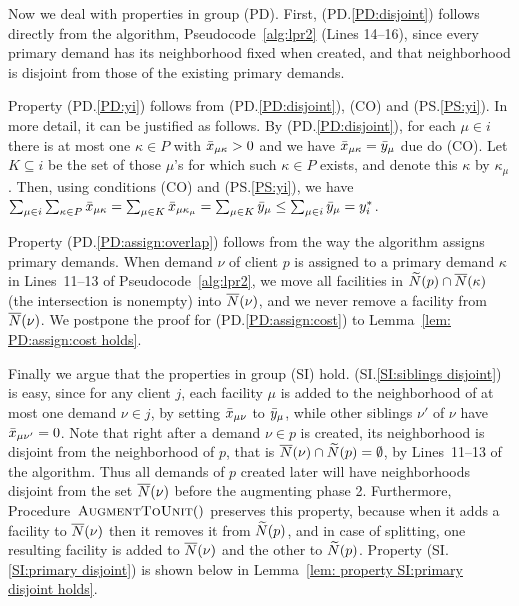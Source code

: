 \documentclass[oneside,final]{ucr}
\begin{document}
Now we deal with properties in group (PD).  First,
(PD.\ref{PD:disjoint}) follows directly from the algorithm,
Pseudocode~\ref{alg:lpr2} (Lines 14--16), since every
primary demand has its neighborhood fixed when created, and
that neighborhood is disjoint from those of the existing primary
demands.

Property (PD.\ref{PD:yi}) follows from (PD.\ref{PD:disjoint}), (CO) and
(PS.\ref{PS:yi}). In more detail, it can be justified as
follows. By (PD.\ref{PD:disjoint}), for each $\mu\in i$ there
is at most one $\kappa\in P$ with ${\bar x}_{\mu\kappa} > 0$
and we have ${\bar x}_{\mu\kappa} = {\bar y}_{\mu}$ due do (CO).
Let $K\subseteq i$ be the set of those $\mu$'s for which
such $\kappa\in P$ exists, and denote this $\kappa$ by
$\kappa_\mu$. Then, using conditions (CO) and
(PS.\ref{PS:yi}), we have $ \sum_{\mu\in i}\sum_{\kappa\in
  P}{\bar x}_{\mu\kappa} = \sum_{\mu\in K}{\bar x}_{\mu\kappa_\mu}
= \sum_{\mu\in K}{\bar y}_{\mu} \leq \sum_{\mu\in i}
{\bar y}_{\mu} = y_i^\ast$.

Property (PD.\ref{PD:assign:overlap}) follows from the way the algorithm
assigns primary demands.  When demand $\nu$ of
client $p$ is assigned to a primary demand $\kappa$ in
Lines~11--13 of Pseudocode~\ref{alg:lpr2}, we move all
facilities in ${\widetilde N}(p)\cap {\overline{N}}(\kappa)$ (the
intersection is nonempty) into ${\overline{N}}(\nu)$, and we never
remove a facility from ${\overline{N}}(\nu)$.  We postpone the proof 
for (PD.\ref{PD:assign:cost}) to Lemma~\ref{lem: PD:assign:cost holds}.

Finally we argue that the properties in group (SI)
hold. (SI.\ref{SI:siblings disjoint}) is easy, since for any client
$j$, each facility $\mu$ is added to the neighborhood of at most one
demand $\nu\in j$, by setting ${\bar x}_{\mu\nu}$ to ${\bar y}_\mu$, while
other siblings $\nu'$ of $\nu$ have ${\bar x}_{\mu\nu'}=0$. Note that
right after a demand $\nu\in p$ is created, its neighborhood is
disjoint from the neighborhood of $p$, that is ${\overline{N}}(\nu)\cap
{\widetilde N}(p) = \emptyset$, by Lines~11--13 of the algorithm. Thus all
demands of $p$ created later will have neighborhoods disjoint from the
set ${\overline{N}}(\nu)$ before the augmenting phase 2. Furthermore,
Procedure~${\textsc{AugmentToUnit}}()$ preserves this property, because when it
adds a facility to ${\overline{N}}(\nu)$ then it removes it from
${\widetilde N}(p)$, and in case of splitting, one resulting facility is
added to ${\overline{N}}(\nu)$ and the other to ${\widetilde N}(p)$. Property
(SI.\ref{SI:primary disjoint}) is shown below in Lemma~\ref{lem:
  property SI:primary disjoint holds}.
\end{document}
